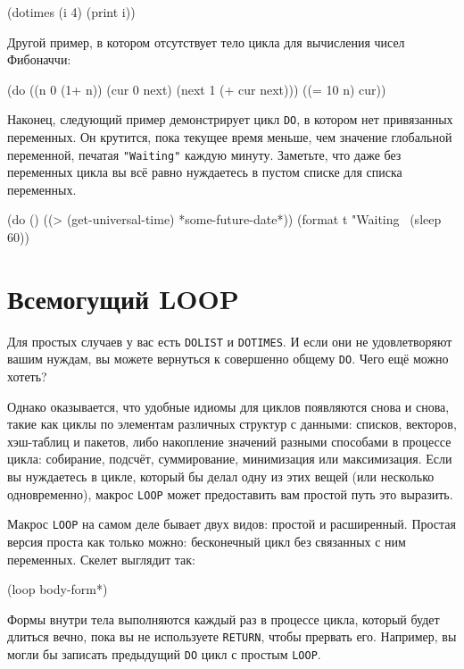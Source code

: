 \begin{myverb}
(dotimes (i 4) (print i))
\end{myverb}

Другой пример, в котором отсутствует тело цикла для вычисления чисел Фибоначчи:

\begin{myverb}
(do ((n 0 (1+ n))
     (cur 0 next)
     (next 1 (+ cur next)))
    ((= 10 n) cur))
\end{myverb}

Наконец, следующий пример демонстрирует цикл \lstinline{DO}, в котором нет привязанных
переменных. Он крутится, пока текущее время меньше, чем значение глобальной переменной,
печатая \lstinline{"Waiting"} каждую минуту. Заметьте, что даже без переменных цикла вы всё равно
нуждаетесь в пустом списке для списка переменных.

\begin{myverb}
(do ()
    ((> (get-universal-time) *some-future-date*))
  (format t "Waiting~%
  (sleep 60)) 
\end{myverb}

\section{Всемогущий LOOP}

Для простых случаев у вас есть \lstinline{DOLIST} и \lstinline{DOTIMES}. И если они не удовлетворяют
вашим нуждам, вы можете вернуться к совершенно общему \lstinline{DO}. Чего ещё можно хотеть?

Однако оказывается, что удобные идиомы для циклов появляются снова и снова, такие как
циклы по элементам различных структур с данными: списков, векторов, хэш-таблиц и пакетов,
либо накопление значений разными способами в процессе цикла: собирание, подсчёт,
суммирование, минимизация или максимизация. Если вы нуж\-дае\-тесь в цикле, который бы делал
одну из этих вещей (или несколько одновременно), макрос \lstinline{LOOP} может предоставить вам
простой путь это выразить.

Макрос \lstinline{LOOP} на самом деле бывает двух видов: простой и расширенный. Простая версия
проста как только можно: бесконечный цикл без связанных с ним переменных. Скелет выглядит
так:

\begin{myverb}
(loop
  body-form*)
\end{myverb}

Формы внутри тела выполняются каждый раз в процессе цикла, который будет длиться вечно,
пока вы не используете \lstinline{RETURN}, чтобы прервать его. Например, вы могли бы записать
предыдущий \lstinline{DO} цикл с простым \lstinline{LOOP}.

